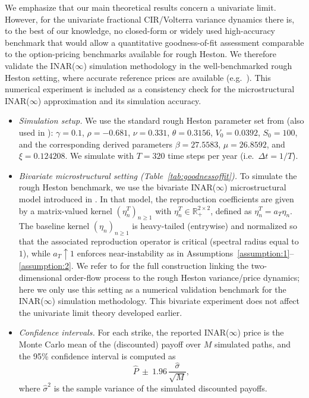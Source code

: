 \documentclass[letterpaper]{article}
\numberwithin{equation}{section}
\theoremstyle{definition}
\theoremstyle{remark}
\begin{document}
{We emphasize that our main theoretical results concern a univariate limit. However, for the univariate fractional CIR/Volterra variance dynamics there is, to the best of our knowledge, no closed-form or widely used high-accuracy benchmark that would allow a quantitative goodness-of-fit assessment comparable to the option-pricing benchmarks available for rough Heston. We therefore validate the INAR($\infty$) simulation methodology in the well-benchmarked rough Heston setting, where accurate reference prices are available (e.g.\ \cite{callegaro2021fast}). This numerical experiment is included as a consistency check for the microstructural INAR($\infty$) approximation and its simulation accuracy.}

{
\begin{itemize}
  \item \textit{Simulation setup.} We use the standard rough Heston parameter set from \cite{callegaro2021fast} (also used in \cite{wang2025rough}): $\gamma=0.1$, $\rho=-0.681$, $\nu=0.331$, $\theta=0.3156$, $V_0=0.0392$, $S_0=100$, and the corresponding derived parameters $\beta=27.5583$, $\mu=26.8592$, and $\xi=0.124208$. We simulate with $T=320$ time steps per year (i.e.\ $\Delta t = 1/T$).

  \item \textit{Bivariate microstructural setting (Table~\ref{tab:goodnessoffit}).} To simulate the rough Heston benchmark, we use the bivariate INAR($\infty$) microstructural model introduced in \cite{wang2025rough}. In that model, the reproduction coefficients are given by a matrix-valued kernel $(\eta_n^T)_{n\ge1}$ with $\eta_n^T\in\mathbb{R}_+^{2\times2}$, defined as $\eta_n^T=a_T\eta_n$. The baseline kernel $(\eta_n)_{n\ge1}$ is heavy-tailed (entrywise) and normalized so that the associated reproduction operator is critical (spectral radius equal to $1$), while $a_T\uparrow 1$ enforces near-instability as in Assumptions~\ref{assumption:1}--\ref{assumption:2}. We refer to \cite{wang2025rough} for the full construction linking the two-dimensional order-flow process to the rough Heston variance/price dynamics; here we only use this setting as a numerical validation benchmark for the INAR($\infty$) simulation methodology. This bivariate experiment does not affect the univariate limit theory developed earlier.

  \item \textit{Confidence intervals.} For each strike, the reported INAR($\infty$) price is the Monte Carlo mean of the (discounted) payoff over $M$ simulated paths, and the 95\% confidence interval is computed as
  \[
    \widehat{P}\ \pm\ 1.96\,\frac{\widehat{\sigma}}{\sqrt{M}},
  \]
  where $\widehat{\sigma}^2$ is the sample variance of the simulated discounted payoffs.
\end{itemize}
}
\end{document}
